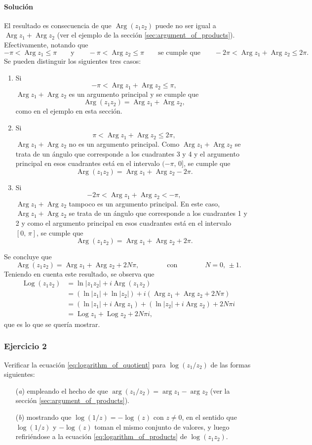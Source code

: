 \documentclass[a4paper]{report}
\DeclareMathOperator{\Arg}{Arg}
\DeclareMathOperator{\Log}{Log}
\begin{document}
\paragraph{Solución} El resultado es consecuencia de que \(\Arg(z_1z_2)\) puede no ser igual a \(\Arg z_1+\Arg z_2\) (ver el ejemplo de la sección \ref{sec:argument_of_products}). Efectivamente, notando que 
\[
 -\pi<\Arg z_1\leq\pi
 \qquad\textrm{y}\qquad
 -\pi<\Arg z_2\leq\pi
 \qquad\textrm{se cumple que}\qquad
 -2\pi<\Arg z_1+\Arg z_2\leq2\pi.
\]
Se pueden distinguir los siguientes tres casos:
\begin{enumerate}
 \item Si
 \[
 -\pi<\Arg z_1+\Arg z_2\leq\pi,
 \]
 \(\Arg z_1+\Arg z_2\) es un argumento principal y se cumple que 
 \[
  \Arg(z_1z_2)=\Arg z_1+\Arg z_2,
 \]
 como en el ejemplo en esta sección.
 \item Si
 \[
  \pi<\Arg z_1+\Arg z_2\leq2\pi,
 \]
 \(\Arg z_1+\Arg z_2\) no es un argumento principal. Como \(\Arg z_1+\Arg z_2\) se trata de un ángulo que corresponde a los cuadrantes 3 y 4 y el argumento principal en esos cuadrantes está en el intervalo \((-\pi,\,0]\), se cumple que 
 \[
  \Arg(z_1z_2)=\Arg z_1+\Arg z_2-2\pi.
 \]
 \item Si
 \[
  -2\pi<\Arg z_1+\Arg z_2<-\pi,
 \]
 \(\Arg z_1+\Arg z_2\) tampoco es un argumento principal. En este caso, \(\Arg z_1+\Arg z_2\) se trata de un ángulo que corresponde a los cuadrantes 1 y 2 y como el argumento principal en esos cuadrantes está en el intervalo \([0,\,\pi]\), se cumple que 
 \[
  \Arg(z_1z_2)=\Arg z_1+\Arg z_2+2\pi.
 \]
\end{enumerate}
Se concluye que 
\[
 \Arg(z_1z_2)=\Arg z_1+\Arg z_2+2N\pi,
 \qquad\qquad\textrm{con}\qquad\qquad
 N=0,\,\pm1.
\]
Teniendo en cuenta este resultado, se observa que 
\begin{align*}
 \Log(z_1z_2)&=\ln|z_1z_2|+i\Arg(z_1z_2)\\
   &=(\ln|z_1|+\ln|z_2|)+i(\Arg z_1+\Arg z_2+2N\pi)\\
   &=(\ln|z_1|+i\Arg z_1)+(\ln|z_2|+i\Arg z_2)+2N\pi i\\
   &=\Log z_1+\Log z_2+2N\pi i,
\end{align*}
que es lo que se quería mostrar.

\subsubsection{Ejercicio 2}

Verificar la ecuación \ref{eq:logarithm_of_quotient} para \(\log(z_1/z_2)\) de las formas siguientes:
\begin{enumerate}
 \item[(\textit{a})] empleando el hecho de que \(\arg(z_1/z_2)=\arg z_1-\arg z_2\) (ver la sección \ref{sec:argument_of_products}).
 \item[(\textit{b})] mostrando que \(\log(1/z)=-\log(z)\) con \(z\neq0\), en el sentido que \(\log(1/z)\) y \(-\log(z)\) toman el mismo conjunto de valores, y luego refiriéndose a la ecuación \ref{eq:logarithm_of_products} de \(\log(z_1z_2)\).
\end{enumerate}
\end{document}
